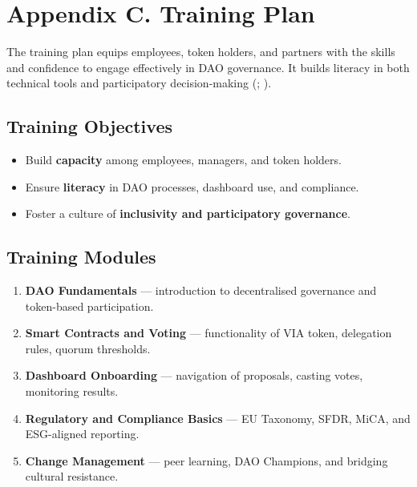\documentclass[
  english,
  12pt,
  oneside,
  open=any]{scrbook}
\providecommand{\tightlist}{%
  \setlength{\itemsep}{0pt}\setlength{\parskip}{0pt}}\usepackage{longtable,booktabs,array}
\begin{document}
\section{Appendix C. Training Plan}\label{sec-training-plan}

The training plan equips employees, token holders, and partners with the
skills and confidence to engage effectively in DAO governance. It builds
literacy in both technical tools and participatory decision-making
(;
).

\subsection{Training Objectives}\label{training-objectives}

\begin{itemize}
\tightlist
\item
  Build \textbf{capacity} among employees, managers, and token
  holders.\\
\item
  Ensure \textbf{literacy} in DAO processes, dashboard use, and
  compliance.\\
\item
  Foster a culture of \textbf{inclusivity and participatory governance}.
\end{itemize}

\subsection{Training Modules}\label{training-modules}

\begin{enumerate}
\def\labelenumi{\arabic{enumi}.}
\tightlist
\item
  \textbf{DAO Fundamentals} --- introduction to decentralised governance
  and token-based participation.\\
\item
  \textbf{Smart Contracts and Voting} --- functionality of VIA token,
  delegation rules, quorum thresholds.\\
\item
  \textbf{Dashboard Onboarding} --- navigation of proposals, casting
  votes, monitoring results.\\
\item
  \textbf{Regulatory and Compliance Basics} --- EU Taxonomy, SFDR, MiCA,
  and ESG-aligned reporting.\\
\item
  \textbf{Change Management} --- peer learning, DAO Champions, and
  bridging cultural resistance.
\end{enumerate}
\end{document}
